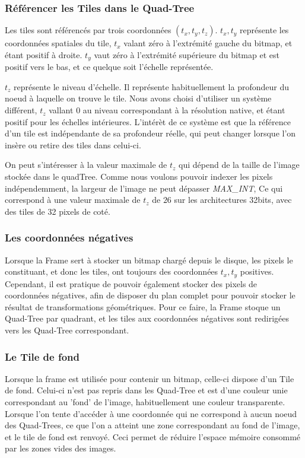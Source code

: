 			\subsubsection{Référencer les Tiles dans le Quad-Tree}
				Les tiles sont référencés par trois coordonnées $(t_x,t_y,t_z)$. $t_x,t_y$ représente les coordonnées spatiales du tile, $t_x$ valant
				zéro à l'extrémité gauche du bitmap, et étant positif à droite. $t_y$ vaut zéro à l'extrémité supérieure du bitmap et est positif vers le bas,
				et ce quelque soit l'échelle représentée.
				
				$t_z$ représente le niveau d'échelle. Il représente habituellement la profondeur du noeud à laquelle on trouve le tile. Nous avons
				choisi d'utiliser un système différent, $t_z$ vallant $0$ au niveau correspondant à la résolution native, et étant positif
				pour les échelles intérieures. L'intérèt de ce système est que la référence d'un tile est indépendante de sa profondeur réelle,
				qui peut changer lorsque l'on insère ou retire des tiles dans celui-ci.
				
				On peut s'intéresser à la valeur maximale de $t_z$ qui dépend de la taille de l'image stockée dans le quadTree.
				Comme nous voulons pouvoir indexer les pixels indépendemment, la largeur de l'image ne peut dépasser
				\emph{MAX\_INT}, Ce qui correspond à une valeur maximale de $t_z$ de $26$ sur les architectures 32bits, avec des tiles de 32 pixels
				de coté.
				
			\subsubsection{Les coordonnées négatives}
				Lorsque la Frame sert à stocker un bitmap chargé depuis le disque, les pixels le constituant, et donc les tiles, ont toujours des
				coordonnées $t_x,t_y$ positives. Cependant, il est pratique de pouvoir également stocker des pixels de coordonnées négatives, afin
				de disposer du plan complet pour pouvoir stocker le résultat de transformations géométriques. Pour ce faire, la Frame
				stoque un Quad-Tree par quadrant, et les tiles aux coordonnées négatives sont redirigées vers les Quad-Tree correspondant.

			\subsubsection{Le Tile de fond}
				Lorsque la frame est utilisée pour contenir un bitmap, celle-ci dispose d'un Tile de fond. Celui-ci n'est pas repris
				dans les Quad-Tree et est d'une couleur unie correspondant au 'fond' de l'image, habituellement une couleur transparente.
				Lorsque l'on tente d'accéder à une coordonnée qui ne correspond à aucun noeud des Quad-Trees, ce que l'on a atteint une zone
				correspondant au fond de l'image, et le tile de fond est renvoyé. Ceci permet de réduire l'espace mémoire consommé par les zones 
				vides des images.

